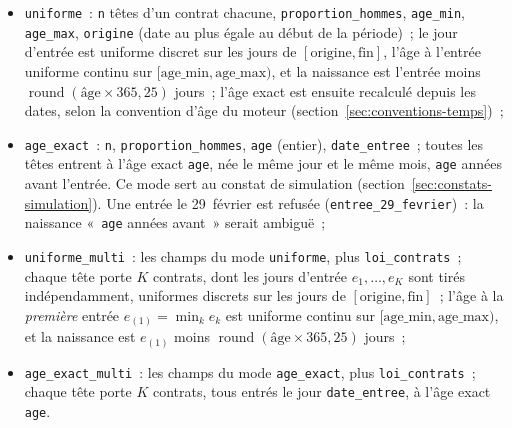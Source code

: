 \documentclass[a4paper,11pt]{article}
\newcommand{\code}[1]{\texttt{\small #1}}
\begin{document}
\begin{itemize}[leftmargin=*, itemsep=2pt]
  \item \code{uniforme}~: \code{n} têtes d'un contrat chacune, \code{proportion\_hommes},
    \code{age\_min}, \code{age\_max}, \code{origine} (date au plus égale au
    début de la période)~; le jour d'entrée est uniforme discret sur les jours
    de $[\text{origine}, \text{fin}]$, l'âge à l'entrée uniforme continu sur
    $[\text{age\_min}, \text{age\_max})$, et la naissance est l'entrée moins
    $\operatorname{round}(\text{âge} \times 365{,}25)$ jours~; l'âge exact est
    ensuite recalculé depuis les dates, selon la convention d'âge du moteur
    (section~\ref{sec:conventions-temps})~;
  \item \code{age\_exact}~: \code{n}, \code{proportion\_hommes}, \code{age}
    (entier), \code{date\_entree}~; toutes les têtes entrent à l'âge exact
    \code{age}, née le même jour et le même mois, \code{age} années avant
    l'entrée. Ce mode sert au constat de simulation
    (section~\ref{sec:constats-simulation}). Une entrée le 29~février est
    refusée (\code{entree\_29\_fevrier})~: la naissance «~\code{age} années
    avant~» serait ambiguë~;
  \item \code{uniforme\_multi}~: les champs du mode \code{uniforme}, plus
    \code{loi\_contrats}~; chaque tête porte $K$ contrats, dont les jours
    d'entrée $e_1, \dots, e_K$ sont tirés indépendamment, uniformes discrets
    sur les jours de $[\text{origine}, \text{fin}]$~; l'âge à la
    \emph{première} entrée $e_{(1)} = \min_k e_k$ est uniforme continu sur
    $[\text{age\_min}, \text{age\_max})$, et la naissance est $e_{(1)}$ moins
    $\operatorname{round}(\text{âge} \times 365{,}25)$ jours~;
  \item \code{age\_exact\_multi}~: les champs du mode \code{age\_exact}, plus
    \code{loi\_contrats}~; chaque tête porte $K$ contrats, tous entrés le
    jour \code{date\_entree}, à l'âge exact \code{age}.
\end{itemize}
\end{document}
